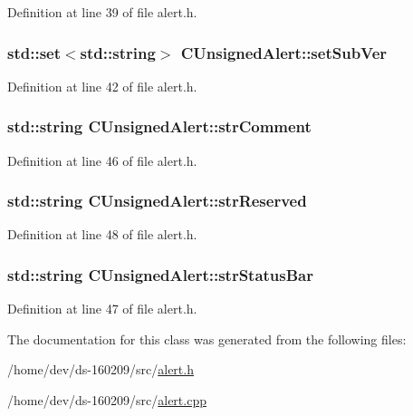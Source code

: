 Definition at line 39 of file alert.\+h.

\hypertarget{class_c_unsigned_alert_a1b7148c413e1781222c5748935cad200}{}
\subsubsection[{set\+Sub\+Ver}]{\setlength{\rightskip}{0pt plus 5cm}std\+::set$<$std\+::string$>$ C\+Unsigned\+Alert\+::set\+Sub\+Ver}\label{class_c_unsigned_alert_a1b7148c413e1781222c5748935cad200}


Definition at line 42 of file alert.\+h.

\hypertarget{class_c_unsigned_alert_a8c9cd8c9706c14df3c5d6b9b1ed3b130}{}
\subsubsection[{str\+Comment}]{\setlength{\rightskip}{0pt plus 5cm}std\+::string C\+Unsigned\+Alert\+::str\+Comment}\label{class_c_unsigned_alert_a8c9cd8c9706c14df3c5d6b9b1ed3b130}


Definition at line 46 of file alert.\+h.

\hypertarget{class_c_unsigned_alert_a0115109fd39d48f37a412d5f50a78828}{}
\subsubsection[{str\+Reserved}]{\setlength{\rightskip}{0pt plus 5cm}std\+::string C\+Unsigned\+Alert\+::str\+Reserved}\label{class_c_unsigned_alert_a0115109fd39d48f37a412d5f50a78828}


Definition at line 48 of file alert.\+h.

\hypertarget{class_c_unsigned_alert_a97cfbf9a49b770bb84e49389ac1489c2}{}
\subsubsection[{str\+Status\+Bar}]{\setlength{\rightskip}{0pt plus 5cm}std\+::string C\+Unsigned\+Alert\+::str\+Status\+Bar}\label{class_c_unsigned_alert_a97cfbf9a49b770bb84e49389ac1489c2}


Definition at line 47 of file alert.\+h.



The documentation for this class was generated from the following files\+:\begin{DoxyCompactItemize}
\item 
/home/dev/ds-\/160209/src/\hyperlink{alert_8h}{alert.\+h}\item 
/home/dev/ds-\/160209/src/\hyperlink{alert_8cpp}{alert.\+cpp}\end{DoxyCompactItemize}
